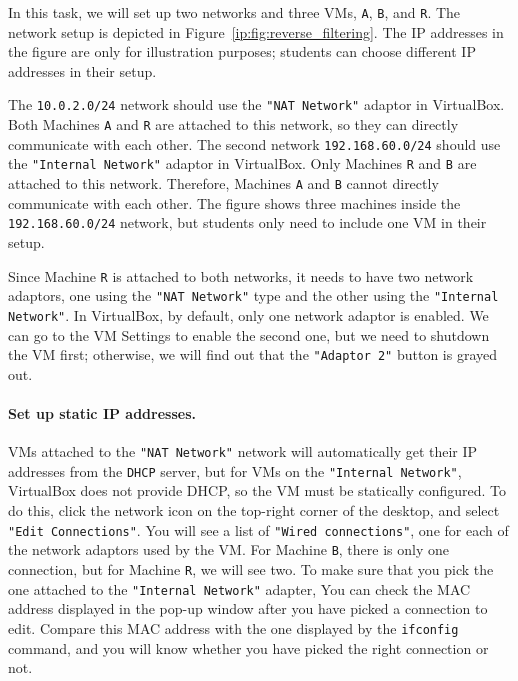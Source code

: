 In this task, we will set up two networks and three VMs, \texttt{A}, \texttt{B}, and 
\texttt{R}. The network setup is depicted in Figure~\ref{ip:fig:reverse_filtering}. 
The IP addresses in the figure are only for illustration purposes; students can choose
different IP addresses in their setup.


The \texttt{10.0.2.0/24} network should use the \texttt{"NAT Network"} adaptor 
in VirtualBox. Both Machines \texttt{A} and \texttt{R} are attached 
to this network, so they can directly communicate with each other. 
The second network \texttt{192.168.60.0/24} should use the 
\texttt{"Internal Network"} adaptor in VirtualBox. Only
Machines \texttt{R} and \texttt{B} are attached to this network. 
Therefore, Machines \texttt{A} and \texttt{B} cannot directly 
communicate with each other.
The figure shows three machines inside the \texttt{192.168.60.0/24} network, but 
students only need to include one VM in their setup. 


Since Machine \texttt{R} is attached to both networks, it needs to 
have two network adaptors, one using the \texttt{"NAT Network"} type
and the other using the \texttt{"Internal Network"}. In VirtualBox, 
by default, only one network adaptor is enabled. We can
go to the VM Settings to enable the second one, but  we need to 
shutdown the VM first; otherwise, we will find out that
the \texttt{"Adaptor 2"} button is grayed out.


\paragraph{Set up static IP addresses.}
VMs attached to the \texttt{"NAT Network"} network will automatically get their 
IP addresses from the \texttt{DHCP} server, but for 
VMs on the \texttt{"Internal Network"}, VirtualBox does not provide DHCP, so the
VM must be statically configured. To do this, click the network icon on the top-right corner
of the desktop, and select \texttt{"Edit Connections"}. You will see a list
of \texttt{"Wired connections"}, one for each of the network adaptors used by the VM.
For Machine \texttt{B}, there is only one connection, but 
for Machine \texttt{R}, we will see two. To make sure
that you pick the one attached to the \texttt{"Internal Network"} adapter,
You can check the MAC address displayed in the pop-up window after you have
picked a connection to edit.
Compare this MAC address with the one displayed by the \texttt{ifconfig} command,
and you will know whether you have picked the right connection or not.

